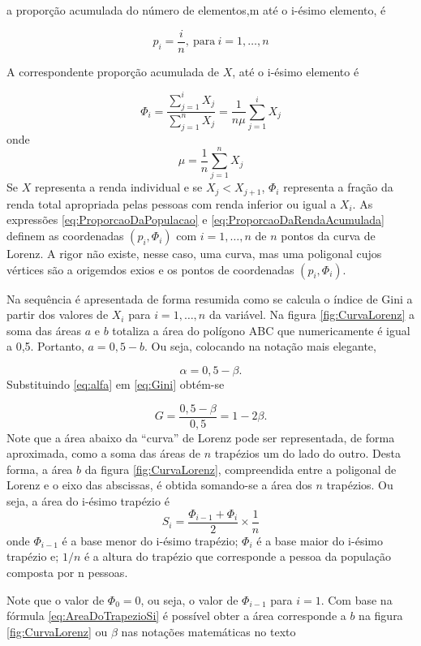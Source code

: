 \documentclass[
]{book}
\begin{document}
a proporção acumulada do número de elementos,m até o i-ésimo elemento, é

\[
p_i = \dfrac{i}{n},~\text{para}~i =1,\ldots, n
\label{eq:ProporcaoDaPopulacao}
\]

A correspondente proporção acumulada de \(X\), até o i-ésimo elemento é

\[
\Phi_i = \dfrac{\sum_{j=1}^{i}X_j}{\sum_{j=1}^{n}X_j} = \dfrac{1}{n\mu}\sum_{j=1}^{i}X_j
\label{eq:ProporcaoDaRendaAcumulada}
\]
onde
\[
\mu = \dfrac{1}{n}\sum_{j=1}^{n}X_j
\]
Se \(X\) representa a renda individual e se \(X_j < X_{j+1}\), \(\Phi_i\) representa a fração da renda total apropriada pelas pessoas com renda inferior ou igual a \(X_i\). As expressões \eqref{eq:ProporcaoDaPopulacao} e \eqref{eq:ProporcaoDaRendaAcumulada} definem as coordenadas \((p_i,\Phi_i)\) com \(i=1,\ldots, n\) de \(n\) pontos da curva de Lorenz. A rigor não existe, nesse caso, uma curva, mas uma poligonal cujos vértices são a origemdos exios e os pontos de coordenadas \((p_i,\Phi_i)\).

Na sequência é apresentada de forma resumida como se calcula o índice de Gini a partir dos valores de \(X_i\) para \(i = 1,\ldots ,n\) da variável. Na figura \ref{fig:CurvaLorenz} a soma das áreas \(a\) e \(b\) totaliza a área do polígono ABC que numericamente é igual a 0,5.
Portanto, \(a = 0,5 - b\). Ou seja, colocando na notação mais elegante,

\[
\alpha = 0,5 - \beta.
\label{eq:alfa}
\]
Substituindo \eqref{eq:alfa} em \eqref{eq:Gini} obtém-se

\[
G = \dfrac{0,5 - \beta}{0,5} = 1 - 2\beta.
\label{eq:GiniEmTermosDeBeta}
\]
Note que a área abaixo da ``curva'' de Lorenz pode ser representada, de forma aproximada, como a soma das áreas de \(n\) trapézios um do lado do outro. Desta forma, a área \(b\) da figura \ref{fig:CurvaLorenz}, compreendida entre a poligonal de Lorenz e o eixo das abscissas, é obtida somando-se a área dos \(n\) trapézios. Ou seja, a área do i-ésimo trapézio é
\[
S_i = \dfrac{\Phi_{i-1} + \Phi_i}{2}\times \dfrac{1}{n}
\label{eq:AreaDoTrapezioSi}
\]
onde \(\Phi_{i-1}\) é a base menor do i-ésimo trapézio; \(\Phi_i\) é a base maior do i-ésimo trapézio e; \(1/n\) é a altura do trapézio que corresponde a pessoa da população composta por n pessoas.

Note que o valor de \(\Phi_0 = 0\), ou seja, o valor de \(\Phi_{i-1}\) para \(i=1\). Com base na fórmula \eqref{eq:AreaDoTrapezioSi} é possível obter a área corresponde a \(b\) na figura \ref{fig:CurvaLorenz} ou \(\beta\) nas notações matemáticas no texto
\end{document}
